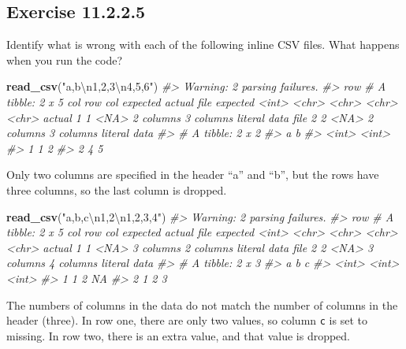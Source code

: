 \documentclass[]{book}
\newenvironment{Shaded}{\begin{snugshade}}{\end{snugshade}}
\newcommand{\CharTok}[1]{\textcolor[rgb]{0.31,0.60,0.02}{#1}}
\newcommand{\CommentTok}[1]{\textcolor[rgb]{0.56,0.35,0.01}{\textit{#1}}}
\newcommand{\KeywordTok}[1]{\textcolor[rgb]{0.13,0.29,0.53}{\textbf{#1}}}
\newcommand{\NormalTok}[1]{#1}
\newcommand{\StringTok}[1]{\textcolor[rgb]{0.31,0.60,0.02}{#1}}
\theoremstyle{plain}
\theoremstyle{remark}
\begin{document}
\hypertarget{exercise-11.2.2.5}{%
\subsection*{\texorpdfstring{Exercise
{11.2.2.5}}{Exercise 11.2.2.5}}\label{exercise-11.2.2.5}}

Identify what is wrong with each of the following inline CSV files. What
happens when you run the code?

\begin{Shaded}
\begin{Highlighting}[]
\KeywordTok{read_csv}\NormalTok{(}\StringTok{"a,b}\CharTok{\textbackslash{}n}\StringTok{1,2,3}\CharTok{\textbackslash{}n}\StringTok{4,5,6"}\NormalTok{)}
\CommentTok{#> Warning: 2 parsing failures.}
\CommentTok{#> row # A tibble: 2 x 5 col     row col   expected  actual    file         expected   <int> <chr> <chr>     <chr>     <chr>        actual 1     1 <NA>  2 columns 3 columns literal data file 2     2 <NA>  2 columns 3 columns literal data}
\CommentTok{#> # A tibble: 2 x 2}
\CommentTok{#>       a     b}
\CommentTok{#>   <int> <int>}
\CommentTok{#> 1     1     2}
\CommentTok{#> 2     4     5}
\end{Highlighting}
\end{Shaded}

Only two columns are specified in the header ``a'' and ``b'', but the
rows have three columns, so the last column is dropped.

\begin{Shaded}
\begin{Highlighting}[]
\KeywordTok{read_csv}\NormalTok{(}\StringTok{"a,b,c}\CharTok{\textbackslash{}n}\StringTok{1,2}\CharTok{\textbackslash{}n}\StringTok{1,2,3,4"}\NormalTok{)}
\CommentTok{#> Warning: 2 parsing failures.}
\CommentTok{#> row # A tibble: 2 x 5 col     row col   expected  actual    file         expected   <int> <chr> <chr>     <chr>     <chr>        actual 1     1 <NA>  3 columns 2 columns literal data file 2     2 <NA>  3 columns 4 columns literal data}
\CommentTok{#> # A tibble: 2 x 3}
\CommentTok{#>       a     b     c}
\CommentTok{#>   <int> <int> <int>}
\CommentTok{#> 1     1     2    NA}
\CommentTok{#> 2     1     2     3}
\end{Highlighting}
\end{Shaded}

The numbers of columns in the data do not match the number of columns in
the header (three). In row one, there are only two values, so column
\texttt{c} is set to missing. In row two, there is an extra value, and
that value is dropped.
\end{document}
